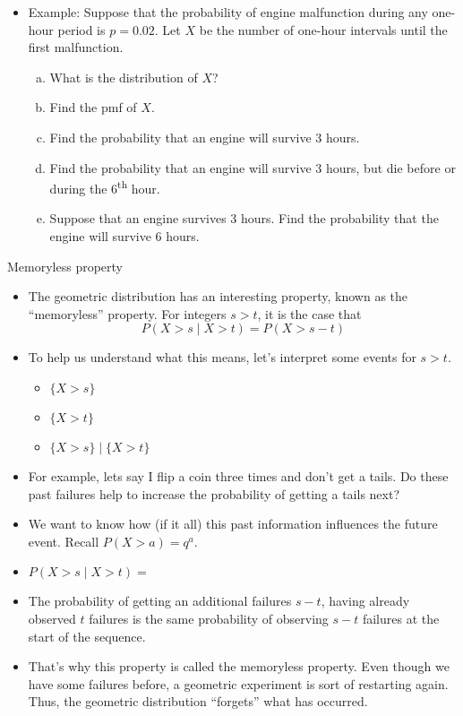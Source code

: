 \documentclass{article}
\begin{document}
\begin{itemize}
    \item Example: Suppose that the probability of engine malfunction during any one-hour period is $p = 0.02$. Let $X$ be the number of one-hour intervals until the first malfunction.
    \begin{enumerate}[a)]
        \item What is the distribution of $X$?\vspace{40pt}
        \item Find the pmf of $X$.\vspace{40pt}
        \item Find the probability that an engine will survive 3 hours.\vspace{40pt}
        \item Find the probability that an engine will survive 3 hours, but die before or during the 6\textsuperscript{th} hour.\vspace{50pt}
        \item Suppose that an engine survives 3 hours. Find the probability that the engine will survive 6 hours.\vspace{40pt}
    \end{enumerate}
\end{itemize}\bigskip

Memoryless property\bigskip
\begin{itemize}
    \item The geometric distribution has an interesting property, known as the ``memoryless'' property. For integers $s > t$, it is the case that
    \[P(X > s \mid X > t) = P(X > s - t)\]
    \item To help us understand what this means, let's interpret some events for $s > t$.
    \begin{itemize}
        \item $\{X > s\}$\smallskip
        \item $\{X > t\}$\smallskip
        \item $\{X > s\} \mid \{X > t\}$\bigskip
    \end{itemize}
    \item For example, lets say I flip a coin three times and don't get a tails. Do these past failures help to increase the probability of getting a tails next?\vspace{30pt}
    \item We want to know how (if it all) this past information influences the future event. Recall $P(X > a) = q^a$.
    \item[] $P(X > s \mid X > t) = $\vspace{120pt}
    \item The probability of getting an additional failures $s - t$, having already observed $t$ failures is the same probability of observing $s - t$ failures at the start of the sequence.\vspace{140pt}
    \item That's why this property is called the memoryless property. Even though we have some failures before, a geometric experiment is sort of restarting again. Thus, the geometric distribution ``forgets'' what has occurred.
\end{itemize}\bigskip
\end{document}

